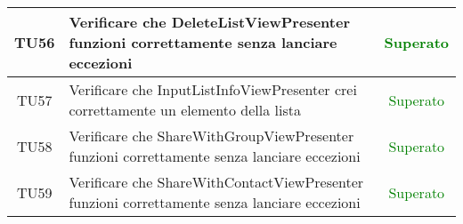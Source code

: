 \begin{center}
\begin{longtable}{|c|>{\centering}m{10cm}|c|}
		TU56 & Verificare che DeleteListViewPresenter funzioni correttamente senza lanciare eccezioni & \textcolor{Green}{Superato}\\ \hline
		TU57 & Verificare che InputListInfoViewPresenter crei correttamente un elemento della lista & \textcolor{Green}{Superato}\\ \hline
		TU58 & Verificare che ShareWithGroupViewPresenter funzioni correttamente senza lanciare eccezioni & \textcolor{Green}{Superato}\\ \hline
		TU59 & Verificare che ShareWithContactViewPresenter funzioni correttamente senza lanciare eccezioni & \textcolor{Green}{Superato}\\ \hline
	\end{longtable}
\end{center}
